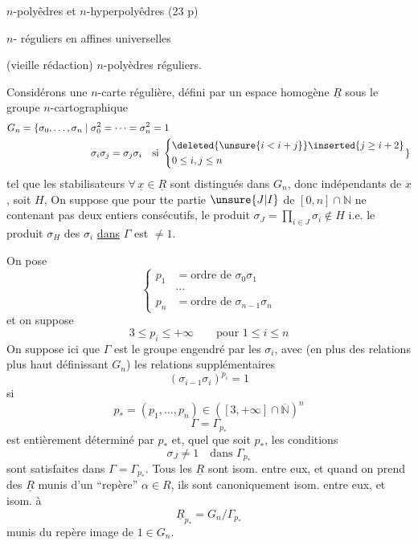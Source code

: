$n$-polyêdres et $n$-hyperpolyêdres
(23 p)

$n$- réguliers en  affines universelles

(vieille rédaction)
$n$-polyèdres réguliers.

Considérons  une $n$-carte régulière, défini par un espace homogène $\underline{R}$  sous le groupe $n$-cartographique
\[
\begin{aligned}
G_n=\{\sigma_0,\ldots,\sigma_n\mid {}&\sigma_0^2=\cdots=\sigma_n^2=1\\
&\sigma_i\sigma_j=\sigma_j\sigma_i\quad\text{si }\left\{\begin{aligned}&\deleted{\unsure{i< i+j}}\inserted{j\geq i+2}\\&0\leq i,j\leq n\end{aligned}\right.\}
\end{aligned}
\]
tel que les stabilisateurs  $\forall\,\underline{x}\in\underline{R}$ sont distingués dans $G_n$, donc indépendants de $x$, soit $H$,  On suppose que pour tte partie $\unsure{J|I}$ de $[0,n]\cap\mathbb{N}$ ne contenant pas deux entiers consécutifs, le produit  $\sigma_J=\prod_{i\in J}\sigma_i\notin H$ i.e. le produit $\sigma_H$ des $\sigma_i$ \uline{dans} $\Gamma$ est $\neq1$.

On pose
\[
\left\{\begin{aligned}
p_1&=\text{ordre de }\sigma_0\sigma_1\\
&\cdots\\
p_n&=\text{ordre de }\sigma_{n-1}\sigma_n
\end{aligned}\right.
\]
et on suppose
\[
3\leq p_i\leq+\infty\qquad\text{pour }1\leq i\leq n
\]
On suppose ici que $\Gamma$ est le groupe engendré par les $\sigma_i$, avec (en plus des relations plus haut définissant $G_n$) les relations supplémentaires
\[
(\sigma_{i-1}\sigma_i)^{p_i}=1
\]
si
\[
p_*=(p_1,\ldots,p_n)\in([3,+\infty]\cap\overline{\mathbb{N}})^n
\]
\[
\Gamma=\Gamma_{p_*}
\]
est entièrement déterminé par $p_*$ et, quel que soit $p_*$, les conditions 
\[
\sigma_J\neq1\quad\text{dans }\Gamma_{p_*}
\]
sont satisfaites dans $\Gamma=\Gamma_{p_*}$. Tous les $\underline{R}$ sont isom. entre eux, et quand on prend des $\underline{R}$ munis d'un ``repère'' $\alpha\in R$, ils sont canoniquement isom. entre eux, et  isom. à 
\[
\underline{R}_{p_*}=G_n/\Gamma_{p_*}
\]
munis du repère image de $1\in G_n$.

